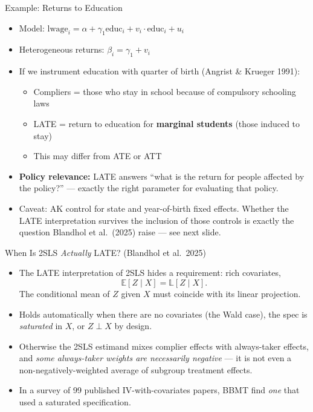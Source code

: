 \documentclass[aspectratio=169, handout]{beamer}
\numberwithin{equation}{section}
\begin{document}
\begin{frame}{Example: Returns to Education}
\begin{itemize}
\item Model: $\text{lwage}_i = \alpha + \gamma_1 \text{educ}_i + v_i\cdot\text{educ}_i + u_i$
\item Heterogeneous returns: $\beta_i = \gamma_1 + v_i$
\item If we instrument education with quarter of birth (Angrist \& Krueger 1991):
\begin{itemize}
\item Compliers = those who stay in school because of compulsory schooling laws
\item LATE = return to education for \textbf{marginal students} (those induced to stay)
\item This may differ from ATE or ATT
\end{itemize}
\item \textbf{Policy relevance:} LATE answers ``what is the return for people affected by the policy?'' --- exactly the right parameter for evaluating that policy.
\item \alert{Caveat:} AK control for state and year-of-birth fixed effects.  Whether the LATE interpretation survives the inclusion of those controls is exactly the question Blandhol et al.\ (2025) raise --- see next slide.
\end{itemize}
\end{frame}


\begin{frame}{When Is 2SLS \emph{Actually} LATE? (Blandhol et al.\ 2025)}
\begin{itemize}
\item The LATE interpretation of 2SLS hides a requirement: \alert{rich covariates},
$$\mathbb{E}[Z\mid X] = \mathbb{L}[Z\mid X].$$
The conditional mean of $Z$ given $X$ must coincide with its linear projection.
\item Holds automatically when there are no covariates (the Wald case), the spec is \emph{saturated} in $X$, or $Z\perp X$ by design.
\item Otherwise the 2SLS estimand mixes complier effects with always-taker effects, and \emph{some always-taker weights are necessarily negative} --- it is not even a non-negatively-weighted average of subgroup treatment effects.
\item In a survey of 99 published IV-with-covariates papers, BBMT find \emph{one} that used a saturated specification.
\end{itemize}
\end{frame}
\end{document}
